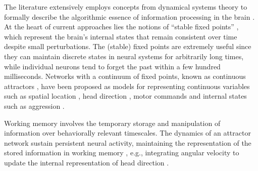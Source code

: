 \documentclass[12pt,letterpaper, onecolumn]{article}
\theoremstyle{definition}
\theoremstyle{remark}
\begin{document}
The literature extensively employs concepts from dynamical systems theory to formally describe the algorithmic essence of information processing in the brain \citep{vyas2020computation}.
At the heart of current approaches lies the notions of ``stable fixed points'' \citep{sussillo2013blackbox, mante2013context} , %
 which represent the brain's internal states that remain consistent over time despite small perturbations.
The (stable) fixed points are extremely useful since they can maintain discrete states in neural systems for arbitrarily long times, while individual neurons tend to forget the past within a few hundred milliseconds. %
Networks with a continuum of fixed points, known as continuous attractors \citep{khona2022}, %
 have been proposed as models for representing continuous variables such as spatial location \citep{stringer2002placecells}, %
  head direction \citep{kim2019generation}, %
  motor commands \citep{stringer2003} and  internal states such as aggression \citep{nair2023}.

Working memory involves the temporary storage and manipulation of information over behaviorally relevant timescales.
The dynamics of an attractor network sustain persistent neural activity, maintaining the representation of the stored information in working memory \citep{koulakov2002}, e.g., integrating angular velocity to update the internal representation of head direction \citep{noorman2022}. %
\end{document}
